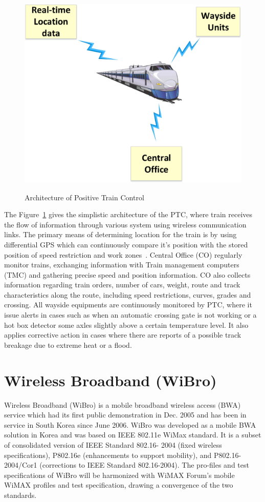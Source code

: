\begin{figure}[!ht]
\centering
\includegraphics[width=\textwidth,height=10cm,keepaspectratio]{images/Gill/5G/ptc.eps} 
\caption{Architecture of Positive Train Control}
\label{ptc}
\end{figure}


The Figure~\ref{ptc} gives the simplistic architecture of the PTC, where train receives the flow of information through various system using wireless communication links. The primary means of determining location for the train is by using differential GPS which can continuously compare it's position with the stored position of speed restriction and work zones~\cite{5338992}. Central Office (CO) regularly monitor trains, exchanging information with Train management computers (TMC) and gathering precise speed and position information. CO also collects information regarding train orders, number of cars, weight, route and track characteristics along the route, including speed restrictions, curves, grades and crossing. All wayside equipments are continuously monitored by PTC, where it issue alerts in cases such as when an automatic crossing gate is not working or a hot box detector some axles slightly above a certain temperature level. It also applies corrective action in cases where there are reports of a possible track breakage due to extreme heat or a flood.

\section{Wireless Broadband (WiBro)}

Wireless Broadband (WiBro) is a mobile broadband wireless access (BWA) service which had its first public demonstration in Dec. 2005 and has been in service in South Korea since June 2006. WiBro was developed as a mobile BWA solution in Korea and was based on IEEE 802.11e WiMax standard. It is a subset of consolidated version of IEEE Standard 802.16-
2004 (fixed wireless specifications), P802.16e (enhancements to support mobility), and P802.16-2004/Cor1 (corrections to IEEE Standard 802.16-2004). The pro-files and test specifications of WiBro will be harmonized with WiMAX Forum’s mobile WiMAX profiles and test specification, drawing a convergence of the two standards.



